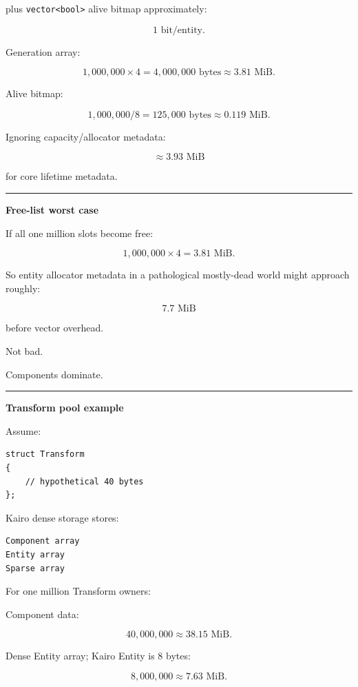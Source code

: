 plus \texttt{vector\textless{}bool\textgreater{}} alive bitmap approximately:

\[
1\text{ bit/entity}.
\]

Generation array:

\[
1,000,000\times4
=
4,000,000\text{ bytes}
\approx3.81\text{ MiB}.
\]

Alive bitmap:

\[
1,000,000/8
=
125,000\text{ bytes}
\approx0.119\text{ MiB}.
\]

Ignoring capacity/allocator metadata:

\[
\approx3.93\text{ MiB}
\]

for core lifetime metadata.

\begin{center}\rule{0.5\linewidth}{0.5pt}\end{center}

\textbf{Free-list worst case}

If all one million slots become free:

\[
1,000,000\times4
=
3.81\text{ MiB}.
\]

So entity allocator metadata in a pathological mostly-dead world might approach roughly:

\[
7.7\text{ MiB}
\]

before vector overhead.

Not bad.

Components dominate.

\begin{center}\rule{0.5\linewidth}{0.5pt}\end{center}

\textbf{Transform pool example}

Assume:

\begin{verbatim}
struct Transform
{
    // hypothetical 40 bytes
};
\end{verbatim}

Kairo dense storage stores:

\begin{verbatim}
Component array
Entity array
Sparse array
\end{verbatim}

For one million Transform owners:

Component data:

\[
40,000,000
\approx38.15\text{ MiB}.
\]

Dense Entity array; Kairo Entity is 8 bytes:

\[
8,000,000
\approx7.63\text{ MiB}.
\]

